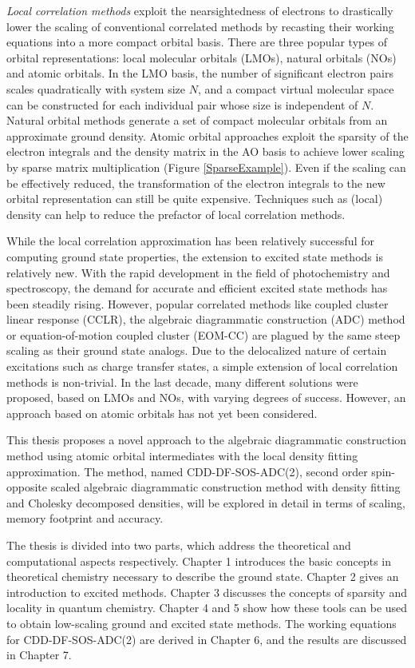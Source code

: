 \emph{Local correlation methods} exploit the nearsightedness of electrons to drastically lower the scaling of conventional correlated methods by recasting their working equations into a more compact orbital basis. There are three popular types of orbital representations: local molecular orbitals (LMOs), natural orbitals (NOs) and atomic orbitals. In the LMO basis, the number of significant electron pairs scales quadratically with system size $N$, and a compact virtual molecular space can be constructed for each individual pair whose size is independent of $N$. Natural orbital methods generate a set of compact molecular orbitals from an approximate ground density. Atomic orbital approaches exploit the sparsity of the electron integrals and the density matrix in the AO basis to achieve lower scaling by sparse matrix multiplication (Figure \ref{SparseExample}). Even if the scaling can be effectively reduced, the transformation of the electron integrals to the new orbital representation can still be quite expensive. Techniques such as (local) density can help to reduce the prefactor of local correlation methods.

While the local correlation approximation has been relatively successful for computing ground state properties, the extension to excited state methods is relatively new. With the rapid development in the field of photochemistry and spectroscopy, the demand for accurate and efficient excited state methods has been steadily rising. However, popular correlated methods like coupled cluster linear response (CCLR), the algebraic diagrammatic construction (ADC) method or equation-of-motion coupled cluster (EOM-CC) are plagued by the same steep scaling as their ground state analogs. Due to the delocalized nature of certain excitations such as charge transfer states, a simple extension of local correlation methods is non-trivial. In the last decade, many different solutions were proposed, based on LMOs and NOs, with varying degrees of success. However, an approach based on atomic orbitals has not yet been considered.

This thesis proposes a novel approach to the algebraic diagrammatic construction method using atomic orbital intermediates with the local density fitting approximation. The method, named CDD-DF-SOS-ADC(2), second order spin-opposite scaled  algebraic diagrammatic construction method with density fitting and Cholesky decomposed densities, will be explored in detail in terms of scaling, memory footprint and accuracy.

The thesis is divided into two parts, which address the theoretical and computational aspects respectively. Chapter 1 introduces the basic concepts in theoretical chemistry necessary to describe the ground state. Chapter 2 gives an introduction to excited methods. Chapter 3 discusses the concepts of sparsity and locality in quantum chemistry. Chapter 4 and 5 show how these tools can be used to obtain low-scaling ground and excited state methods. The working equations for CDD-DF-SOS-ADC(2) are derived in Chapter 6, and the results are discussed in Chapter 7.


